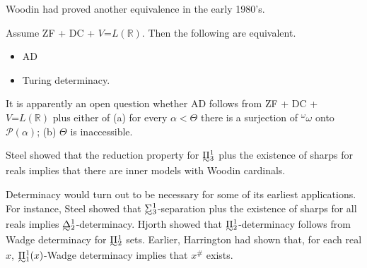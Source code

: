 \documentclass{book}%
\newcommand{\breals}{{^{\omega}}\omega}
\def\underTilde#1{{\baselineskip=0pt\vtop{\hbox{$#1$}\hbox{$\sim$}}}{}}
\newcommand{\uTPi}{\underTilde{\Pi}}
\newcommand{\uTSigma}{\underTilde{\Sigma}}
\newcommand{\uTDelta}{\underTilde{\Delta}}
\begin{document}
Woodin had proved another equivalence in the early 1980's.

\begin{theorem} Assume {\rm ZF + DC + }$V\mathord{=}L(\mathbb{R})$. Then
the following are equivalent.
\begin{itemize}
\item {\rm AD}
\item Turing determinacy.
\end{itemize}
\end{theorem}

It is apparently an open question whether AD follows from ZF + DC +
$V\mathord{=}L(\mathbb{R})$ plus either of (a) for every $\alpha< \Theta$
there is a surjection of $\breals$ onto $\mathcal{P}(\alpha)$; (b)
$\Theta$ is inaccessible.

Steel  showed that the reduction property for
$\uTPi^{1}_{3}$ plus the existence of sharps for reals implies that
there are inner models with Woodin cardinals.










Determinacy would turn out to be necessary for some of its earliest applications.
For instance, Steel  showed that $\uTSigma^{1}_{3}$-separation plus
the existence of sharps for all reals implies $\uTDelta^{1}_{2}$-determinacy. Hjorth 
showed that $\uTPi^{1}_{2}$-determinacy follows from Wadge determinacy for $\uTPi^{1}_{2}$ sets. Earlier, Harrington
had shown that, for each real $x$, $\uTPi^{1}_{1}(x)$-Wadge determinacy implies that $x^{\#}$ exists.



\end{document}
